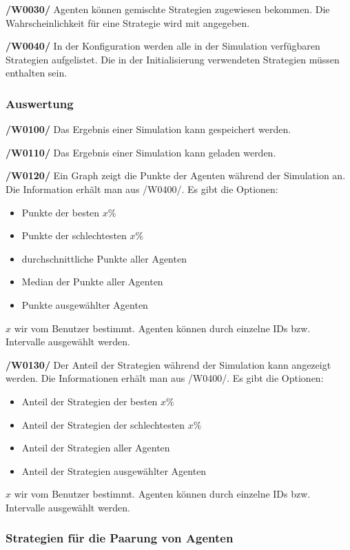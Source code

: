 \textbf{/W0030/}
Agenten können gemischte Strategien zugewiesen bekommen. Die Wahrscheinlichkeit für eine Strategie wird mit angegeben.

\textbf{/W0040/}
In der Konfiguration werden alle in der Simulation verfügbaren Strategien aufgelistet. Die in der Initialisierung verwendeten Strategien müssen enthalten sein.

\subsubsection{Auswertung}

\textbf{/W0100/}
Das Ergebnis einer Simulation kann gespeichert werden.

\textbf{/W0110/}
Das Ergebnis einer Simulation kann geladen werden.

\textbf{/W0120/}
Ein Graph zeigt die Punkte der Agenten während der Simulation an. Die Information erhält man aus /W0400/. Es gibt die Optionen:
\begin{itemize}
\item Punkte der besten $x\%$
\item Punkte der schlechtesten $x\%$
\item durchschnittliche Punkte aller Agenten
\item Median der Punkte aller Agenten
\item Punkte ausgewählter Agenten
\end{itemize}
$x$ wir vom Benutzer bestimmt. Agenten können durch einzelne IDs bzw. Intervalle ausgewählt werden. 

\textbf{/W0130/}
Der Anteil der Strategien während der Simulation kann angezeigt werden. Die Informationen erhält man aus /W0400/. Es gibt die Optionen:
\begin{itemize}
\item Anteil der Strategien der besten $x\%$
\item Anteil der Strategien der schlechtesten $x\%$
\item Anteil der Strategien aller Agenten
\item Anteil der Strategien ausgewählter Agenten
\end{itemize}
$x$ wir vom Benutzer bestimmt. Agenten können durch einzelne IDs bzw. Intervalle ausgewählt werden. 

\subsubsection{Strategien für die Paarung von Agenten}

